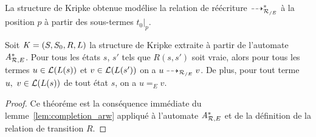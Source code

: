 La structure de Kripke obtenue modélise la relation de réécriture $\dashrightarrow_{\mathcal R_{/E}}^*$ 
à la position $p$ à partir des sous-termes $t_0|_p$.

\begin{theorem}
  Soit $\mathit K=(S, S_0, R, L)$ la structure de Kripke extraite à partir de l'automate ${\mathit A}_{\mathcal R,E}^*$.
  Pour tous les états $s$, $s'$ tels que $R(s, s')$ soit vraie, alors pour tous les termes
  $u \in \mathcal{L}(L(s))$ et $v \in \mathcal{L}(L(s'))$ on a  $u \dashrightarrow_{{\mathcal R_{/E}}} v$. De plus, pour tout terme $u,\ v \in \mathcal{L}(L(s))$
  de tout état $s$, on a $u =_E v$.
\end{theorem}

\begin{proof}
  Ce théoréme est la conséquence immédiate du lemme~\ref{lem:completion_arw} 
  appliqué à l'automate ${\mathit A}_{\mathcal R,E}^*$ et de la définition de la relation de transition $R$.
\end{proof}




